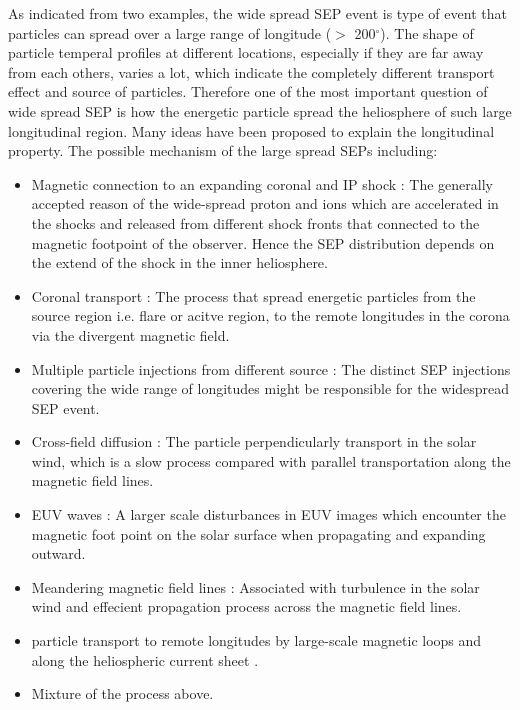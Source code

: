 As indicated from two examples, the wide spread \ac{SEP} event is type of event that particles can spread over a large range of longitude ($>$ 200$^\circ$). The shape of particle temperal profiles at different locations, especially if they are far away from each others, varies a lot, which indicate the completely different transport effect and source of particles. 
Therefore one of the most important question of wide spread \ac{SEP} is how the energetic particle spread the heliosphere of such large longitudinal region. Many ideas have been proposed to explain the longitudinal property. The possible mechanism of the large spread SEPs including:
\begin{itemize}
	\item Magnetic connection to an expanding coronal and IP shock \citep{Cliver1995ICRC, Torsti1999JGR, Reames1999, cane2003two, Richardson2014SoPh, Kouloumavakos2019ApJ}: The generally accepted reason of the wide-spread proton and ions which are accelerated in the shocks and released from different shock fronts that connected to the magnetic footpoint of the observer. Hence the SEP distribution depends on the extend of the shock in the inner heliosphere.

	\item Coronal transport \cite{Reinhard1974SoPh, Newkirk1978JGR}: The process that spread energetic particles from the source region i.e. flare or acitve region, to the remote longitudes in the corona via the divergent magnetic field. 
	\item Multiple particle injections from different source \citep{dresing202317}: The distinct \ac{SEP} injections covering the wide range of longitudes might be responsible for the widespread SEP event.
	\item Cross-field diffusion \citep{Dresing2012SoPh}: The particle perpendicularly transport in the solar wind, which is a slow process compared with parallel transportation along the magnetic field lines. 
	\item EUV waves \citet{Rouillard2012ApJ, Park2013ApJ}: A larger scale disturbances in EUV images which encounter the magnetic foot point on the solar surface when propagating and expanding outward.
	\item Meandering magnetic field lines \citet{Laitinen2016AA, Laitinen2023ApJL}: Associated with turbulence in the solar wind and effecient propagation process across the magnetic field lines.
	\item particle transport to remote longitudes by large-scale magnetic loops \cite{Klassen2018AA, Schrijver2013ApJ} and along the heliospheric current sheet \cite{Battarbee2018ApJ}.
	\item Mixture of the process above.
\end{itemize}

